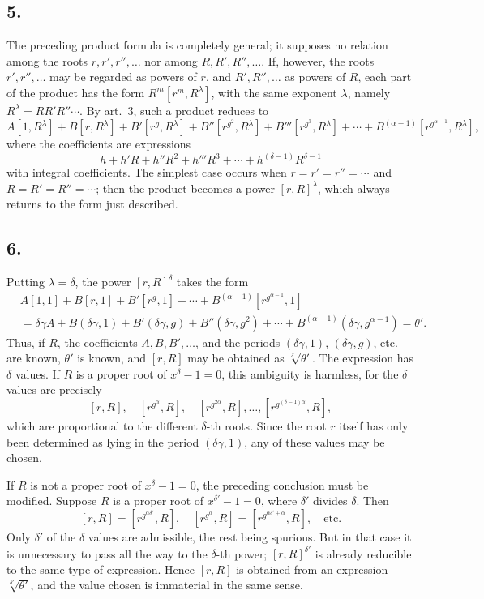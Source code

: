 \documentclass[12pt]{article}
\begin{document}
\subsection*{5.}

The preceding product formula is completely general; it supposes no relation among the roots $r,r',r'',\ldots$ nor among $R,R',R'',\ldots$. If, however, the roots $r',r'',\ldots$ may be regarded as powers of $r$, and $R',R'',\ldots$ as powers of $R$, each part of the product has the form $R^m[r^m,R^\lambda]$, with the same exponent $\lambda$, namely $R^\lambda=RR'R''\cdots$. By art.~3, such a product reduces to
\[
A[1,R^\lambda]+B[r,R^\lambda]+B'[r^g,R^\lambda]+B''[r^{g^2},R^\lambda]
+B'''[r^{g^3},R^\lambda]+\cdots+B^{(\alpha-1)}[r^{g^{\alpha-1}},R^\lambda],
\]
where the coefficients are expressions
\[
h+h'R+h''R^2+h'''R^3+\cdots+h^{(\delta-1)}R^{\delta-1}
\]
with integral coefficients. The simplest case occurs when $r=r'=r''=\cdots$ and $R=R'=R''=\cdots$; then the product becomes a power $[r,R]^\lambda$, which always returns to the form just described.

\subsection*{6.}

Putting $\lambda=\delta$, the power $[r,R]^\delta$ takes the form
\[
\begin{aligned}
&A[1,1]+B[r,1]+B'[r^g,1]+\cdots+B^{(\alpha-1)}[r^{g^{\alpha-1}},1]\\
&=\delta\gamma A+B(\delta\gamma,1)+B'(\delta\gamma,g)+B''(\delta\gamma,g^2)+\cdots+
B^{(\alpha-1)}(\delta\gamma,g^{\alpha-1})=\theta'.
\end{aligned}
\]
Thus, if $R$, the coefficients $A,B,B',\ldots$, and the periods $(\delta\gamma,1)$, $(\delta\gamma,g)$, etc. are known, $\theta'$ is known, and $[r,R]$ may be obtained as $\sqrt[\delta]{\theta'}$. The expression has $\delta$ values. If $R$ is a proper root of $x^\delta-1=0$, this ambiguity is harmless, for the $\delta$ values are precisely
\[
[r,R],\quad [r^{g^\alpha},R],\quad [r^{g^{2\alpha}},R],\ldots,
[r^{g^{(\delta-1)\alpha}},R],
\]
which are proportional to the different $\delta$-th roots. Since the root $r$ itself has only been determined as lying in the period $(\delta\gamma,1)$, any of these values may be chosen.

If $R$ is not a proper root of $x^\delta-1=0$, the preceding conclusion must be modified. Suppose $R$ is a proper root of $x^{\delta'}-1=0$, where $\delta'$ divides $\delta$. Then
\[
[r,R]=[r^{g^{\alpha\delta'}},R],\quad
[r^{g^\alpha},R]=[r^{g^{\alpha\delta'+\alpha}},R],\quad\text{etc.}
\]
Only $\delta'$ of the $\delta$ values are admissible, the rest being spurious. But in that case it is unnecessary to pass all the way to the $\delta$-th power; $[r,R]^{\delta'}$ is already reducible to the same type of expression. Hence $[r,R]$ is obtained from an expression $\sqrt[\delta']{\theta'}$, and the value chosen is immaterial in the same sense.
\end{document}
